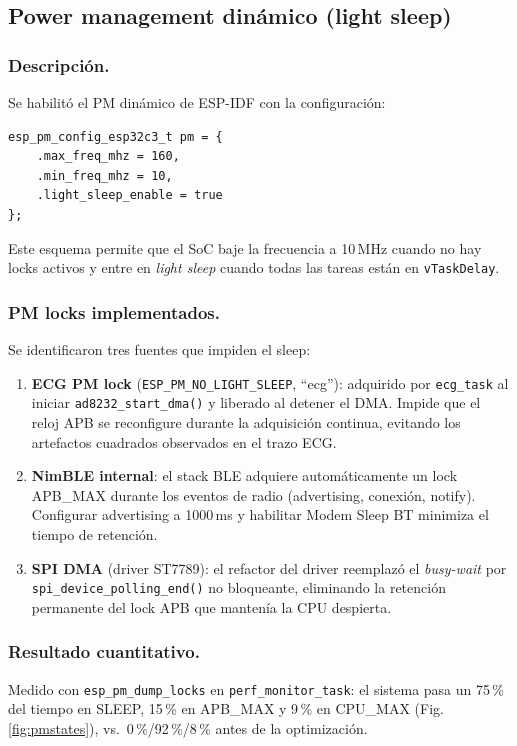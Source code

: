 \documentclass[letterpaper,11pt]{article}
\newcommand{\rfigura}[1]{Fig.\,\ref{#1}}
\begin{document}
\subsection{Power management dinámico (light sleep)}
\label{sec:pm_impl}
\subsubsection{Descripción.} Se habilitó el PM dinámico de ESP-IDF con la configuración:
\begin{verbatim}
esp_pm_config_esp32c3_t pm = {
    .max_freq_mhz = 160,
    .min_freq_mhz = 10,
    .light_sleep_enable = true
};
\end{verbatim}
Este esquema permite que el SoC baje la frecuencia a 10\,MHz cuando no hay locks activos y
entre en \textit{light sleep} cuando todas las tareas están en \texttt{vTaskDelay}.

\subsubsection{PM locks implementados.} Se identificaron tres fuentes que impiden el sleep:
\begin{enumerate}
    \item \textbf{ECG PM lock} (\texttt{ESP\_PM\_NO\_LIGHT\_SLEEP}, ``ecg''): adquirido por
    \texttt{ecg\_task} al iniciar \texttt{ad8232\_start\_dma()} y liberado al detener el DMA.
    Impide que el reloj APB se reconfigure durante la adquisición continua, evitando los
    artefactos cuadrados observados en el trazo ECG.
    \item \textbf{NimBLE internal}: el stack BLE adquiere automáticamente un lock APB\_MAX
    durante los eventos de radio (advertising, conexión, notify). Configurar advertising a
    1000\,ms y habilitar Modem Sleep BT minimiza el tiempo de retención.
    \item \textbf{SPI DMA} (driver ST7789): el refactor del driver reemplazó el
    \textit{busy-wait} por \texttt{spi\_device\_polling\_end()} no bloqueante, eliminando la
    retención permanente del lock APB que mantenía la CPU despierta.
\end{enumerate}

\subsubsection{Resultado cuantitativo.} Medido con \texttt{esp\_pm\_dump\_locks} en
\texttt{perf\_monitor\_task}: el sistema pasa un 75\,\% del tiempo en SLEEP, 15\,\% en
APB\_MAX y 9\,\% en CPU\_MAX (\rfigura{fig:pmstates}), vs.\ 0\,\%/92\,\%/8\,\% antes de la
optimización.
\end{document}
